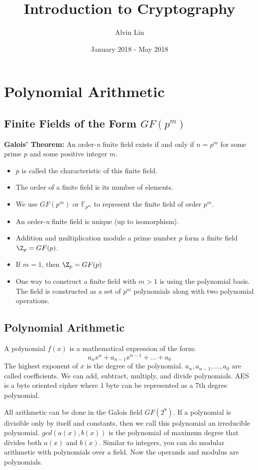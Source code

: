 \documentclass{math}
\title{Introduction to Cryptography}
\author{Alvin Lin}
\date{January 2018 - May 2018}
\begin{document}
\maketitle

\section*{Polynomial Arithmetic}

\subsection*{Finite Fields of the Form \( GF(p^m) \)}
\textbf{Galois' Theorem:} An order-\textit{n} finite field exists if and only if
\( n = p^m \) for some prime \( p \) and some positive integer \( m \).
\begin{itemize}
  \item \( p \) is called the characteristic of this finite field.
  \item The order of a finite field is its number of elements.
  \item We use \( GF(p^m) \) or \( \mathbb{F}_{p^m} \) to represent the finite
  field of order \( p^m \).
  \item An order-\textit{n} finite field is unique (up to isomorphism).
  \item Addition and multiplication module a prime number \( p \) form a finite
  field \( \Z_p = GF(p) \).
  \item If \( m = 1 \), then \( \Z_p = GF(p) \)
  \item One way to construct a finite field with \( m > 1 \) is using the
  polynomial basis. The field is constructed as a set of \( p^m \) polynomials
  along with two polynomial operations.
\end{itemize}

\subsection*{Polynomial Arithmetic}
A polynomial \( f(x) \) is a mathematical expression of the form:
\[ a_nx^n+a_{n-1}x^{n-1}+\dots+a_0 \]
The highest exponent of \( x \) is the degree of the polynomial. \( a_n,
a_{n-1}, \dots, a_0 \) are called coefficients. We can add, subtract, multiply,
and divide polynomials. AES is a byte oriented cipher where 1 byte can be
represented as a 7th degree polynomial.
\par All arithmetic can be done in the Galois field \( GF(2^8) \). If a
polynomial is divisible only by itself and constants, then we call this
polynomial an irreducible polynomial. \( gcd(a(x), b(x)) \) is the polynomial
of maximum degree that divides both \( a(x) \) and \( b(x) \). Similar to
integers, you can do modular arithmetic with polynomials over a field. Now the
operands and modulus are polynomials.
\end{document}
